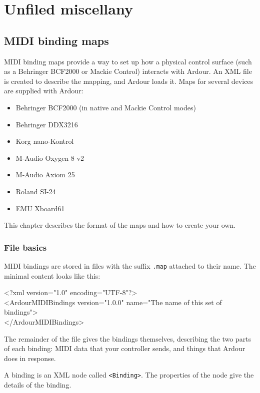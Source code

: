 \documentclass[10pt,a4paper]{book}
\begin{document}
\chapter{Unfiled miscellany}

\section{MIDI binding maps}

MIDI binding maps provide a way to set up how a physical control
surface (such as a Behringer BCF2000 or Mackie Control) interacts with
Ardour.  An XML file is created to describe the mapping, and Ardour
loads it.  Maps for several devices are supplied with Ardour:

\begin{itemize}
\item Behringer BCF2000 (in native and Mackie Control modes)
\item Behringer DDX3216
\item Korg nano-Kontrol
\item M-Audio Oxygen 8 v2
\item M-Audio Axiom 25
\item Roland SI-24
\item EMU Xboard61
\end{itemize}

This chapter describes the format of the maps and how to create your own.


\subsection{File basics}

MIDI bindings are stored in files with the suffix \texttt{.map}
attached to their name. The minimal content looks like this:

\begin{listing}
<?xml version="1.0" encoding="UTF-8"?>\\
<ArdourMIDIBindings version="1.0.0" name="The name of this set of bindings">\\
</ArdourMIDIBindings>\\
\end{listing}

The remainder of the file gives the bindings themselves, describing
the two parts of each binding: MIDI data that your controller sends,
and things that Ardour does in response.

A binding is an XML node called \texttt{<Binding>}.  The properties of the
node give the details of the binding.  
\end{document}
